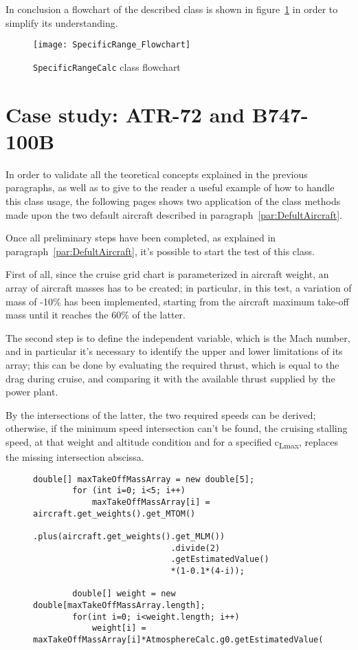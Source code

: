 \bigskip
\noindent
In conclusion a flowchart of the described class is shown in figure~\ref{fig:Figure7} in order to simplify its understanding.

\begin{figure}[t]
\centering
\texttt{[image: SpecificRange\_Flowchart]}
\caption{\lstinline[language=Java]!SpecificRangeCalc! class flowchart}
\label{fig:Figure7}
\end{figure}

\section{Case study: ATR-72 and B747-100B}

In order to validate all the teoretical concepts explained in the previous paragraphs, as well as to give to the reader a useful example of how to handle this class usage, the following pages shows two application of the class methods made upon the two default aircraft described in paragraph~\ref{par:DefultAircraft}.

\bigskip
\noindent
Once all preliminary steps have been completed, as explained in paragraph~\ref{par:DefultAircraft}, it's possible to start the test of this class. 

First of all, since the cruise grid chart is parameterized in aircraft weight, an array of aircraft masses has to be created; in particular, in this test, a variation of mass of -10\% has been implemented, starting from the aircraft maximum take-off mass until it reaches the 60\% of the latter. 

The second step is to define the independent variable, which is the Mach number, and in particular it's necessary to identify the upper and lower limitations of its array; this can be done by evaluating the required thrust, which is equal to the drag during cruise, and comparing it with the available thrust supplied by the power plant.

\noindent
By the intersections of the latter, the two required speeds can be derived; otherwise, if the minimum speed intersection can't be found, the cruising stalling speed, at that weight and altitude condition and for a specified c\textsubscript{Lmax}, replaces the missing intersection abscissa.

\begin{figure}[t]
\begin{lstlisting}[caption={Mass variation in Specific Range test - B747-100B}, captionpos=b, tabsize=2]
		double[] maxTakeOffMassArray = new double[5];
		for (int i=0; i<5; i++)
			maxTakeOffMassArray[i] =	aircraft.get_weights().get_MTOM()
							.plus(aircraft.get_weights().get_MLM())
							.divide(2)
							.getEstimatedValue()
							*(1-0.1*(4-i));

		double[] weight = new double[maxTakeOffMassArray.length];
		for(int i=0; i<weight.length; i++)
			weight[i] = maxTakeOffMassArray[i]*AtmosphereCalc.g0.getEstimatedValue();
\end{lstlisting}
\end{figure}


